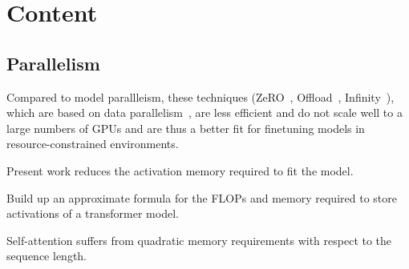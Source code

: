 \section{Content}
\subsection{Parallelism}

Compared to model parallleism, these techniques (ZeRO~\cite{zero}, Offload~\cite{zero-offload}, Infinity~\cite{zero-infinity}), which are based on data parallelism~\cite{megatron-lm}, are less efficient and do not scale well to a large numbers of GPUs and are thus a better fit for finetuning models in resource-constrained environments.~\cite{megatron3}

Present work reduces the activation memory required to fit the model.~\cite{megatron3}

Build up an approximate formula for the FLOPs and memory required to store activations of a transformer model.~\cite{megatron3}

Self-attention suffers from quadratic memory requirements with respect to the sequence length.~\cite{li2021sequence}